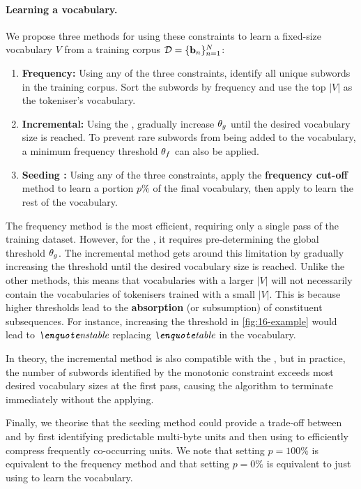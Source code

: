 \paragraph{Learning a vocabulary.} We propose three methods for using these constraints to learn a fixed-size vocabulary \(V\) from a training corpus $\mathcal{D} = \{\mathbf{b}_n\}_{n=1}^N$:
\begin{enumerate}
    \item \textbf{Frequency:} Using any of the three constraints, identify all unique subwords in the training corpus. Sort the subwords by frequency and use the top \(|V|\) as the tokeniser's vocabulary.
    \item \textbf{Incremental:} Using the , gradually increase $\theta_g$ until the desired vocabulary size is reached. To prevent rare subwords from being added to the vocabulary, a minimum frequency threshold $\theta_f$ can also be applied.
    \item \textbf{Seeding \bpe:} Using any of the three constraints, apply the \textbf{frequency cut-off} method to learn a portion $p\%$ of the final vocabulary, then apply \bpe to learn the rest of the vocabulary. 
\end{enumerate}

The frequency method is the most efficient, requiring only a single pass of the training dataset. However, for the , it requires pre-determining the global threshold $\theta_g$. The incremental method gets around this limitation by gradually increasing the threshold until the desired vocabulary size is reached. Unlike the other methods, this means that vocabularies with a larger \(|V|\) will not necessarily contain the vocabularies of tokenisers trained with a small \(|V|\). This is because higher thresholds lead to the \textbf{absorption} (or subsumption) of constituent subsequences. For instance, increasing the threshold in \cref{fig:16-example} would lead to $\ex{nstable}$ replacing $\ex{table}$ in the vocabulary.

In theory, the incremental method is also compatible with the , but in practice, the number of subwords identified by the monotonic constraint exceeds most desired vocabulary sizes at the first pass, causing the algorithm to terminate immediately without the  applying.

Finally, we theorise that the seeding method could provide a trade-off between \tokname and \bpe by first identifying predictable multi-byte units and then using \bpe to efficiently compress frequently co-occurring units. We note that setting $p=100\%$ is equivalent to the frequency method and that setting  $p=0\%$ is equivalent to just using \bpe to learn the vocabulary.

